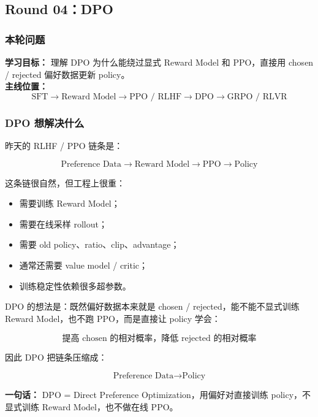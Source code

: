 
\subsection{Round 04：DPO}

\subsubsection{本轮问题}

\begin{conceptbox}
\textbf{学习目标：} 理解 DPO 为什么能绕过显式 Reward Model 和 PPO，直接用 chosen / rejected 偏好数据更新 policy。\\
\textbf{主线位置：}
\[
\text{SFT} \to \text{Reward Model} \to \text{PPO / RLHF} \to \text{DPO} \to \text{GRPO / RLVR}
\]
\end{conceptbox}

\subsubsection{DPO 想解决什么}

昨天的 RLHF / PPO 链条是：

\[
\text{Preference Data}
\to
\text{Reward Model}
\to
\text{PPO}
\to
\text{Policy}
\]

这条链很自然，但工程上很重：

\begin{itemize}[leftmargin=1.5em]
  \item 需要训练 Reward Model；
  \item 需要在线采样 rollout；
  \item 需要 old policy、ratio、clip、advantage；
  \item 通常还需要 value model / critic；
  \item 训练稳定性依赖很多超参数。
\end{itemize}

DPO 的想法是：既然偏好数据本来就是 chosen / rejected，能不能不显式训练 Reward Model，也不跑 PPO，而是直接让 policy 学会：

\[
\text{提高 chosen 的相对概率，降低 rejected 的相对概率}
\]

因此 DPO 把链条压缩成：

\[
\text{Preference Data}
\to
\text{Policy}
\]

\begin{summarybox}
\textbf{一句话：} DPO = Direct Preference Optimization，用偏好对直接训练 policy，不显式训练 Reward Model，也不做在线 PPO。
\end{summarybox}

